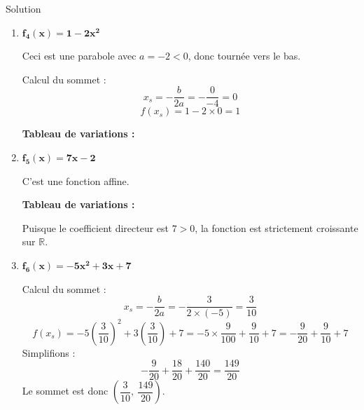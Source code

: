 \documentclass[a4paper,12pt]{article}
\begin{document}
\begin{solutionbox}{Solution}
\begin{enumerate}
    \textbf{Tableau de variations :}

    \begin{center}
    \end{center}

    \item \(\boldsymbol{f_4(x) = 1 - 2x^2}\)

    Ceci est une parabole avec \(a = -2 < 0\), donc tournée vers le bas.

    Calcul du sommet :
    \[
    x_s = -\dfrac{b}{2a} = -\dfrac{0}{-4} = 0
    \]
    \[
    f(x_s) = 1 - 2 \times 0 = 1
    \]

    \textbf{Tableau de variations :}

    \begin{center}
    \end{center}

    \item \(\boldsymbol{f_5(x) = 7x - 2}\)

    C'est une fonction affine.

    \textbf{Tableau de variations :}

    Puisque le coefficient directeur est \(7 > 0\), la fonction est strictement croissante sur \(\mathbb{R}\).

    \begin{center}
    \end{center}

    \item \(\boldsymbol{f_6(x) = -5x^2 + 3x + 7}\)

    Calcul du sommet :
    \[
    x_s = -\dfrac{b}{2a} = -\dfrac{3}{2 \times (-5)} = \dfrac{3}{10}
    \]
    \[
    f(x_s) = -5 \left(\dfrac{3}{10}\right)^2 + 3 \left(\dfrac{3}{10}\right) + 7 = -5 \times \dfrac{9}{100} + \dfrac{9}{10} + 7 = -\dfrac{9}{20} + \dfrac{9}{10} + 7
    \]
    Simplifions :
    \[
    -\dfrac{9}{20} + \dfrac{18}{20} + \dfrac{140}{20} = \dfrac{149}{20}
    \]
    Le sommet est donc \(\left( \dfrac{3}{10},\ \dfrac{149}{20} \right)\).


\end{enumerate}
\end{solutionbox}
\end{document}
